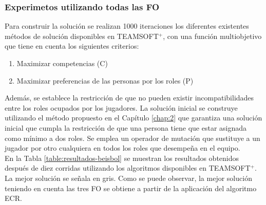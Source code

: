 \subsubsection{Experimetos utilizando todas las FO}

Para construir la solución se realizan 1000 iteraciones los diferentes existentes métodos de solución disponibles en TEAMSOFT$^+$, con una función multiobjetivo que tiene en cuenta los siguientes criterios:
\begin{enumerate}
	\setlength\itemsep{0em}
	\item Maximizar competencias (C)
	\item Maximizar preferencias de las personas por los roles (P)
\end{enumerate}

Además, se establece la restricción de que no pueden existir incompatibilidades entre los roles ocupados por los jugadores. La solución inicial se construye utilizando el método propuesto en el Capítulo \ref{chap:2} que garantiza una solución inicial que cumpla la restricción de que una persona tiene que estar asignada como mínimo a dos roles. Se emplea un operador de mutación que sustituye a un jugador por otro cualquiera en todos los roles que desempeña en el equipo. \\

En la Tabla \ref{table:resultados-beisbol} se muestran los resultados obtenidos después de diez corridas utilizando los algoritmos disponibles en TEAMSOFT$^+$. La mejor solución se señala en gris. Como se puede observar, la mejor solución teniendo en cuenta las tres FO se obtiene a partir de la aplicación del algoritmo ECR.

